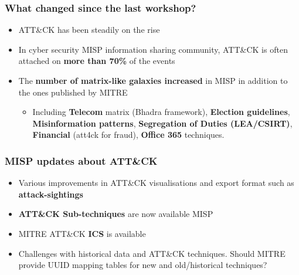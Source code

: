 
\begin{frame}
\titlepage
\end{frame}

\begin{frame}
  \frametitle{What changed since the last workshop?}
  \begin{itemize}
    \item ATT\&CK has been steadily on the rise
    \item In cyber security MISP information sharing community, ATT\&CK is often attached on {\bf more than 70\%} of the events
    \item The {\bf number of matrix-like galaxies increased} in MISP in addition to the ones published by MITRE
        \begin{itemize}
                \item Including {\bf Telecom} matrix (Bhadra framework), {\bf Election guidelines}, {\bf Misinformation patterns}, {\bf Segregation of Duties (LEA/CSIRT)}, {\bf Financial} (att4ck for fraud), {\bf Office 365} techniques.
        \end{itemize}
  \end{itemize}
\end{frame}

\begin{frame}
  \frametitle{MISP updates about ATT\&CK}
  \begin{itemize}
    \item Various improvements in ATT\&CK visualisations and export format such as {\bf attack-sightings}
    \item {\bf ATT\&CK Sub-techniques} are now available MISP
    \item MITRE ATT\&CK {\bf ICS} is available
    \item Challenges with historical data and ATT\&CK techniques. Should MITRE provide UUID mapping tables for new and old/historical techniques?
  \end{itemize}
\end{frame}

